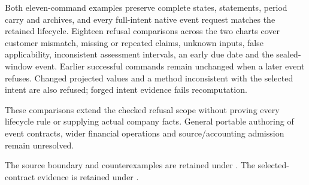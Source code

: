 Both eleven-command examples preserve complete states, statements, period
carry and archives, and every full-intent native event request matches the
retained lifecycle. Eighteen refusal comparisons across the two charts cover
customer mismatch, missing or repeated claims, unknown inputs, false
applicability, inconsistent assessment intervals, an early due date and the
sealed-window event. Earlier successful commands remain unchanged when a later
event refuses. Changed projected values and a method inconsistent with the
selected intent are also refused; forged intent evidence fails recomputation.

These comparisons extend the checked refusal scope without proving every
lifecycle rule or supplying actual company facts. General portable authoring
of event contracts, wider financial operations and source/accounting admission
remain unresolved.

The source boundary and counterexamples are retained under
.
The selected-contract evidence is retained under
.

\par
